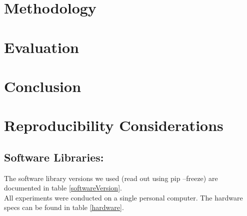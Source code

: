 \documentclass[conference]{IEEEtran}
\begin{document}
\section{Methodology}

\section{Evaluation}

\section{Conclusion}

\section{Reproducibility Considerations}

\subsection{Software Libraries:}
The software library versions we used (read out using pip --freeze) are documented in table \ref{softwareVersion}.\\
All experiments were conducted on a single personal computer. The hardware specs can be found in table \ref{hardware}.\\
\end{document}
